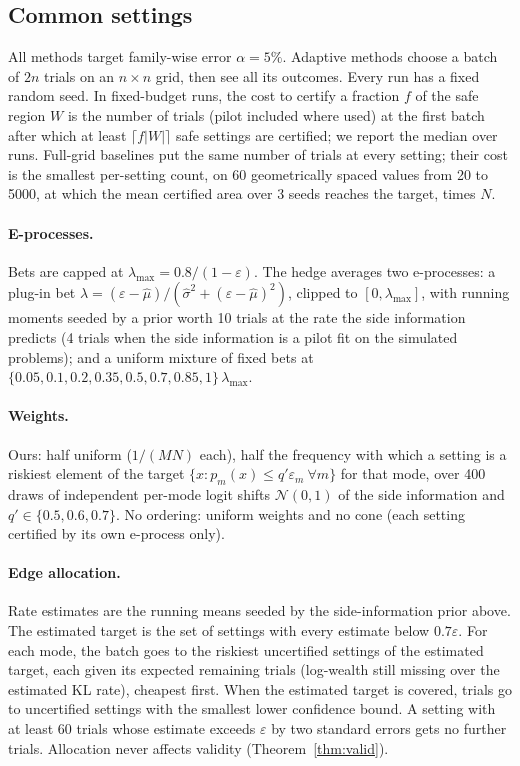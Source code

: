\documentclass{article}
\newcommand{\eps}{\varepsilon}
\begin{document}
\subsection{Common settings}
All methods target family-wise error $\alpha=5\%$. Adaptive methods choose
a batch of $2n$ trials on an $n\times n$ grid, then see all its outcomes.
Every run has a fixed random seed. In fixed-budget runs, the cost to certify a
fraction $f$ of the safe region $W$ is the number of trials (pilot
included where used) at the first batch after which at least
$\lceil f|W|\rceil$ safe settings are certified; we report the median over
runs. Full-grid baselines put the same number of trials at every setting;
their cost is the smallest per-setting count, on 60 geometrically spaced
values from 20 to 5000, at which the mean certified area over 3 seeds
reaches the target, times $N$.

\paragraph{E-processes.} Bets are capped at $\lambda_{\max}=0.8/(1-\eps)$.
The hedge averages two e-processes: a plug-in bet
$\lambda=(\eps-\hat\mu)/(\hat\sigma^2+(\eps-\hat\mu)^2)$, clipped to
$[0,\lambda_{\max}]$, with running moments seeded by a prior worth 10
trials at the rate the side information predicts (4 trials when the
side information is a pilot fit on the simulated problems); and a uniform
mixture of fixed bets at $\{0.05,0.1,0.2,0.35,0.5,0.7,0.85,1\}\,
\lambda_{\max}$.

\paragraph{Weights.} Ours: half uniform ($1/(MN)$ each), half the
frequency with which a setting is a riskiest element of the target
$\{x: p_m(x)\le q'\eps_m\ \forall m\}$ for that mode, over 400 draws of
independent per-mode logit shifts $\mathcal N(0,1)$ of the side
information and $q'\in\{0.5,0.6,0.7\}$. No ordering: uniform weights and
no cone (each setting certified by its own e-process only).

\paragraph{Edge allocation.} Rate estimates are the running means seeded
by the side-information prior above. The estimated target is the set of
settings with every estimate below $0.7\eps$. For each mode, the batch
goes to the riskiest uncertified settings of the estimated target, each
given its expected remaining trials (log-wealth still missing over the
estimated KL rate), cheapest first. When the estimated target is covered,
trials go to uncertified settings with the smallest lower confidence
bound. A setting with at least 60 trials whose estimate exceeds $\eps$ by
two standard errors gets no further trials. Allocation never affects
validity (Theorem~\ref{thm:valid}).
\end{document}
